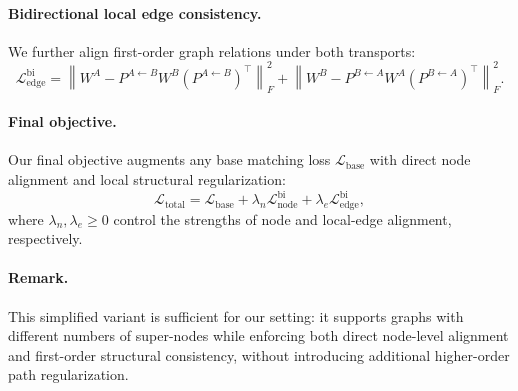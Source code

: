 \paragraph{Bidirectional local edge consistency.}
We further align first-order graph relations under both transports:
\begin{equation}
\mathcal{L}_{\mathrm{edge}}^{\mathrm{bi}}
=
\left\| W^A - P^{A\leftarrow B} W^B (P^{A\leftarrow B})^\top \right\|_F^2
+
\left\| W^B - P^{B\leftarrow A} W^A (P^{B\leftarrow A})^\top \right\|_F^2.
\end{equation}

\paragraph{Final objective.}
Our final objective augments any base matching loss
\(\mathcal{L}_{\mathrm{base}}\) with direct node alignment and local
structural regularization:
\begin{equation}
\mathcal{L}_{\mathrm{total}}
=
\mathcal{L}_{\mathrm{base}}
+
\lambda_n \mathcal{L}_{\mathrm{node}}^{\mathrm{bi}}
+
\lambda_e \mathcal{L}_{\mathrm{edge}}^{\mathrm{bi}},
\end{equation}
where \(\lambda_n,\lambda_e \ge 0\) control the strengths of node and
local-edge alignment, respectively.

\paragraph{Remark.}
This simplified variant is sufficient for our setting: it supports graphs with
different numbers of super-nodes while enforcing both direct node-level
alignment and first-order structural consistency, without introducing
additional higher-order path regularization.

